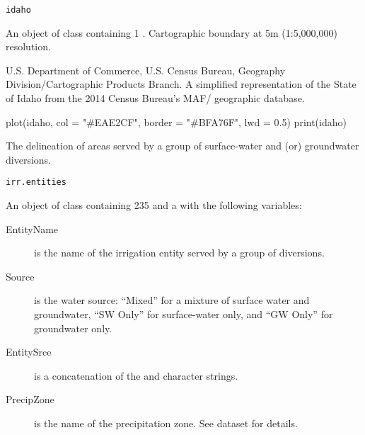 \documentclass[letterpaper]{book}
\begin{document}
%
\begin{Usage}
\begin{verbatim}
idaho
\end{verbatim}
\end{Usage}
%
\begin{Format}
An object of  class containing 1 .
Cartographic boundary at 5m (1:5,000,000) resolution.
\end{Format}
%
\begin{Source}\relax
U.S. Department of Commerce, U.S. Census Bureau, Geography Division/Cartographic Products Branch.
A simplified representation of the State of Idaho from the 2014 Census Bureau's MAF/ geographic database.
\end{Source}
%
\begin{Examples}
\begin{ExampleCode}
plot(idaho, col = "#EAE2CF", border = "#BFA76F", lwd = 0.5)
print(idaho)
\end{ExampleCode}
\end{Examples}
%
\begin{Description}\relax
The delineation of areas served by a group of surface-water and (or) groundwater diversions.
\end{Description}
%
\begin{Usage}
\begin{verbatim}
irr.entities
\end{verbatim}
\end{Usage}
%
\begin{Format}
An object of  class containing 235  and a  with the following variables:
\begin{description}

\item[EntityName] is the name of the irrigation entity served by a group of diversions.
\item[Source] is the water source: ``Mixed'' for a mixture of surface water and groundwater, ``SW Only'' for surface-water only, and ``GW Only'' for groundwater only.
\item[EntitySrce] is a concatenation of the  and  character strings.
\item[PrecipZone] is the name of the precipitation zone.
See  dataset for details.

\end{description}

\end{Format}
\end{document}

